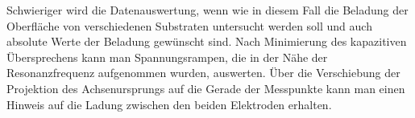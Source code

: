 Schwieriger wird die Datenauswertung, wenn wie in diesem Fall die Beladung der Oberfläche von verschiedenen Substraten untersucht werden soll und auch absolute Werte der Beladung gewünscht sind. Nach Minimierung des kapazitiven Übersprechens kann man Spannungsrampen, die in der Nähe der Resonanzfrequenz aufgenommen wurden, auswerten. Über die Verschiebung der Projektion des Achsenursprungs auf die Gerade der Messpunkte kann man einen Hinweis auf die Ladung zwischen den beiden Elektroden erhalten.
